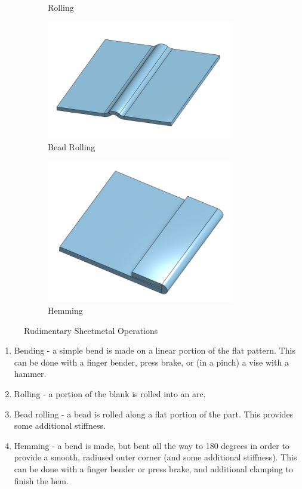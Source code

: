\documentclass[10pt,letterpaper]{book}
\begin{document}
\begin{figure}[H]
\begin{subfigure}[b]{.24\linewidth}
			\caption{Rolling}
		\end{subfigure}\begin{subfigure}[b]{.24\linewidth}
			\includegraphics[width=0.9\textwidth]{imgs/sheet_beadroll.png}
			\caption{Bead Rolling}
		\end{subfigure}\begin{subfigure}[b]{.24\linewidth}
			\includegraphics[width=0.9\textwidth]{imgs/sheet_hem.png}
			\caption{Hemming}
		\end{subfigure}
		\caption{Rudimentary Sheetmetal Operations}
	\end{figure} 
 
 \begin{enumerate}[label=\alph*]
 	\item Bending - a simple bend is made on a linear portion of the flat pattern. This can be done with a finger bender, press brake, or (in a pinch) a vise with a hammer.
 	\item Rolling - a portion of the blank is rolled into an arc.
 	\item Bead rolling - a bead is rolled along a flat portion of the part. This provides some additional stiffness.	
 	\item Hemming - a bend is made, but bent all the way to 180 degrees in order to provide a smooth, radiused outer corner (and some additional stiffness). This can be done with a finger bender or press brake, and additional clamping to finish the hem.
 	\end{enumerate}
 	
\end{document}
